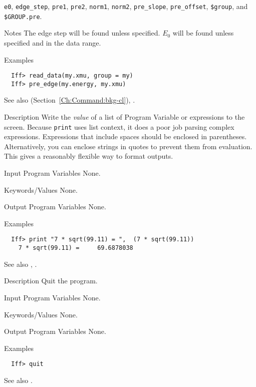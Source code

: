 \begin{IFFcom}
\begin{sloppypar}
    {\tt{e0}}, {\tt{edge\_step}}, {\tt{pre1}},
    {\tt{pre2}}, {\tt{norm1}}, {\tt{norm2}}, {\tt{pre\_slope}},
    {\tt{pre\_offset}}, {\tt{\$group}}, and  {\tt{\$GROUP.pre}}.
  \end{sloppypar}
\item[Notes]  The edge step will be found unless specified.  $E_0$ will
  be found unless specified and in the data range. 
\item[Examples] {\hspace{1.in} \vspace{-0.1truein} \relax}
\begin{verbatim} 
  Iff> read_data(my.xmu, group = my)
  Iff> pre_edge(my.energy, my.xmu)
\end{verbatim} \noindent %
\item[See also] {} (Section~\ref{Ch:Command:bkg-cl}), 
{}.
\end{IFFcom}



\begin{IFFcom}
\item[Description] Write the {\emph{value}} of a list of Program Variable
  or expressions to the screen.  Because {\tt{print}} uses list context, it
  does a poor job parsing complex expressions.  Expressions that include
  spaces should be enclosed in parentheses.   Alternatively, you can
  enclose strings in quotes to prevent them from evaluation.  This gives a
  reasonably flexible way to format outputs.
\item[Input Program Variables] None.
\item[Keywords/Values] None. 
\item[Output Program Variables] None.
\item[Examples] {\hspace{1.in} \vspace{-0.1truein} \relax }
\begin{verbatim} 
  Iff> print "7 * sqrt(99.11) = ",  (7 * sqrt(99.11))
    7 * sqrt(99.11) =     69.6878038
\end{verbatim} \noindent %
\item[See also] {}, {}.
\end{IFFcom}


\begin{IFFcom}
\item[Description] Quit the program.
\item[Input Program Variables] None.
\item[Keywords/Values] None.
\item[Output Program Variables] None.
\item[Examples] {\hspace{1.in} \vspace{-0.1truein} \relax }
\begin{verbatim} 
  Iff> quit
\end{verbatim}
\item[See also] {}.
\end{IFFcom}



